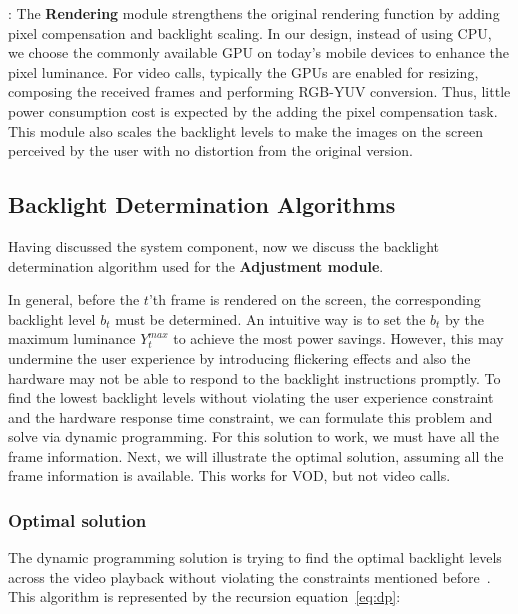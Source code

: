 :
The {\bf Rendering} module strengthens the original rendering function by
adding pixel compensation and backlight scaling.  In our design,
instead of using CPU, we choose the commonly available GPU on today's
mobile devices to enhance the pixel luminance.  For video calls,
typically the GPUs are enabled for resizing, composing the received
frames and performing RGB-YUV conversion. Thus,  little power consumption
cost is expected by the adding the pixel compensation task. This
module also scales the backlight levels to make the images on the
screen perceived by the user with no distortion from the original
version.

\subsection{Backlight Determination Algorithms}
Having discussed the system component, now we discuss the backlight
determination algorithm used for the {\bf Adjustment module}.

In general, before the $t$'th frame is rendered on the screen, the corresponding
backlight level $b_t$ must be determined. An intuitive way is to set
the $b_t$ by the maximum luminance $Y_{t}^{max}$ to achieve the most
power savings. However, this may undermine the user experience by
introducing flickering effects and also the hardware may not be able
to respond to the backlight instructions promptly.  To find the lowest
backlight levels without violating the user experience constraint and
the hardware response time constraint, we can formulate this problem
and solve via dynamic programming.  For this solution to work, we
must have all the frame information.
Next, we will illustrate the optimal solution, assuming all the frame
information is available. This works for VOD, but not video calls. 


\subsubsection{Optimal solution}
The dynamic programming solution is trying to find the optimal
backlight levels across the video playback without violating the
constraints mentioned before~\cite{CAD}. 
This algorithm is represented by the
recursion equation~\ref{eq:dp}:

